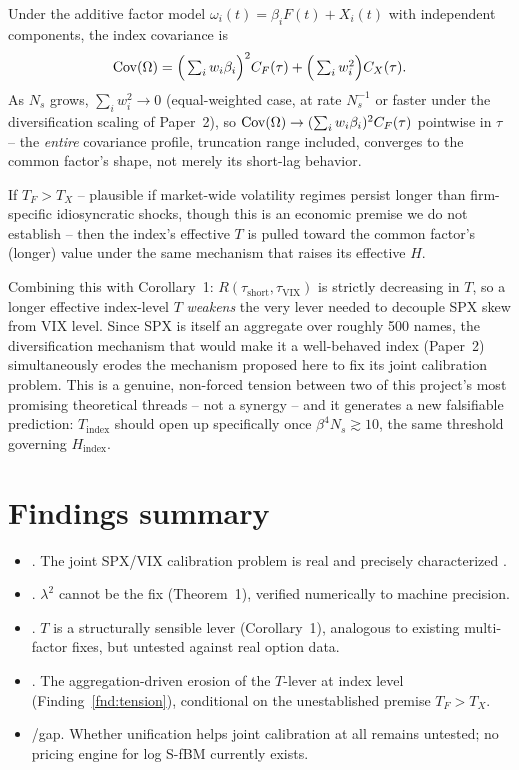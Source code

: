 \documentclass[11pt]{article}
\begin{document}
\begin{proposition}
Under the additive factor model $\omega_i(t)=\beta_i F(t)+X_i(t)$ with independent components, the index covariance is
\[
\operatorname{Cov}(\Omega) = \Big(\textstyle\sum_i w_i\beta_i\Big)^2 C_F(\tau) + \Big(\textstyle\sum_i w_i^2\Big) C_X(\tau).
\]
As $N_s$ grows, $\sum_i w_i^2\to0$ (equal-weighted case, at rate $N_s^{-1}$ or faster under the diversification scaling of Paper~2), so $\operatorname{Cov}(\Omega)\to(\sum_iw_i\beta_i)^2 C_F(\tau)$ pointwise in $\tau$ -- the \emph{entire} covariance profile, truncation range included, converges to the common factor's shape, not merely its short-lag behavior.
\end{proposition}

If $T_F > T_{X}$ -- plausible if market-wide volatility regimes persist longer than firm-specific idiosyncratic shocks, though this is an economic premise we do not establish -- then the index's effective $T$ is pulled toward the common factor's (longer) value under the same mechanism that raises its effective $H$.

\begin{finding}
\label{fnd:tension}
Combining this with Corollary~1: $R(\tau_{\text{short}},\tau_{\text{VIX}})$ is strictly decreasing in $T$, so a longer effective index-level $T$ \emph{weakens} the very lever needed to decouple SPX skew from VIX level. Since SPX is itself an aggregate over roughly 500 names, the diversification mechanism that would make it a well-behaved index (Paper~2) simultaneously erodes the mechanism proposed here to fix its joint calibration problem. This is a genuine, non-forced tension between two of this project's most promising theoretical threads -- not a synergy -- and it generates a new falsifiable prediction: $T_{\text{index}}$ should open up specifically once $\beta^4N_s\gtrsim10$, the same threshold governing $H_{\text{index}}$.
\end{finding}

\section{Findings summary}

\begin{itemize}
\item {}. The joint SPX/VIX calibration problem is real and precisely characterized \citep{gatheral2020quadratic}.
\item {}. $\lambda^2$ cannot be the fix (Theorem~1), verified numerically to machine precision.
\item {}. $T$ is a structurally sensible lever (Corollary~1), analogous to existing multi-factor fixes, but untested against real option data.
\item {}. The aggregation-driven erosion of the $T$-lever at index level (Finding~\ref{fnd:tension}), conditional on the unestablished premise $T_F>T_X$.
\item {}/gap. Whether unification helps joint calibration at all remains untested; no pricing engine for log S-fBM currently exists.
\end{itemize}
\end{document}
